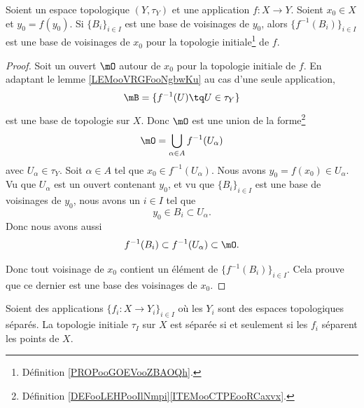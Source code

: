 \begin{proposition}		\label{PROPooOPJCooAIUXCW}
	Soient un espace topologique \( (Y,\tau_Y)\) et une application \(f \colon X\to Y  \). Soient \( x_0\in X\) et \( y_0=f(y_0)\). Si \( \{ B_i \}_{i\in I}\) est une base de voisinages de \( y_0\), alors \( \{ f^{-1}(B_i) \}_{i\in I}\) est une base de voisinages de \( x_0\) pour la topologie initiale\footnote{Définition \ref{PROPooGOEVooZBAOQh}.} de \( f\).
\end{proposition}

\begin{proof}
	Soit un ouvert \( \mO\) autour de \( x_0\) pour la topologie initiale de \( f\). En adaptant le lemme \ref{LEMooVRGFooNgbwKu} au cas d'une seule application,
	\begin{equation}
		\mB=\{ f^{-1}(U)\tq U\in \tau_Y \}
	\end{equation}
	est une base de topologie sur \( X\). Donc \( \mO\) est une union de la forme\footnote{Définition \ref{DEFooLEHPooIlNmpi}\ref{ITEMooCTPEooRCaxvx}.}
	\begin{equation}
		\mO=\bigcup_{\alpha\in A}f^{-1}(U_{\alpha})
	\end{equation}
	avec \( U_{\alpha}\in \tau_Y\). Soit \( \alpha\in A\) tel que \( x_0\in f^{-1}(U_{\alpha})\). Nous avons \( y_0=f(x_0)\in U_{\alpha}\). Vu que \( U_{\alpha}\) est un ouvert contenant \( y_0\), et vu que \( \{ B_i \}_{i\in I}\) est une base de voisinages de \( y_0\), nous avons un \( i\in I\) tel que
	\begin{equation}
		y_0\in B_i\subset U_{\alpha}.
	\end{equation}
	Donc nous avons aussi
	\begin{equation}
		f^{-1}(B_i)\subset f^{-1}(U_{\alpha})\subset \mO.
	\end{equation}

	Donc tout voisinage de \( x_0\) contient un élément de \( \{ f^{-1}(B_i) \}_{i\in I}\). Cela prouve que ce dernier est une base des voisinages de \( x_0\).
\end{proof}

\begin{proposition}	\label{PROPooSEQRooZoQPbZ}
	Soient des applications \( \{f_i \colon X\to Y_i   \}_{i\in I} \) où les \( Y_i\) sont des espaces topologiques séparés. La topologie initiale \( \tau_I\) sur \( X\) est séparée si et seulement si les \( f_i\) séparent les points de \( X\).
\end{proposition}

